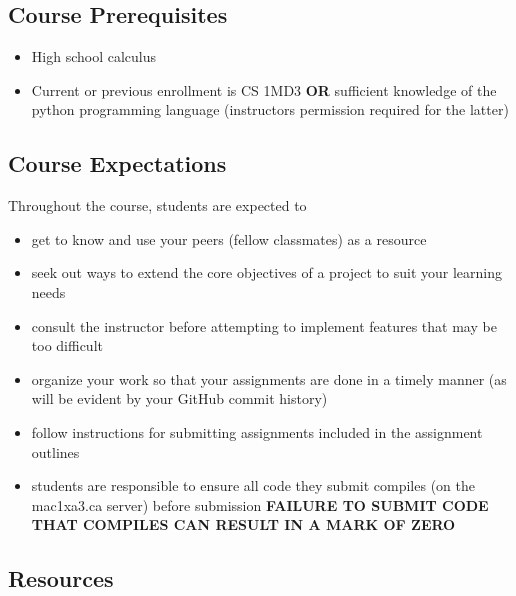 \documentclass{article}
\begin{document}
\subsection{Course Prerequisites}
\label{sec:org0a21196}
\begin{itemize}
\item High school calculus
\item Current or previous enrollment is CS 1MD3 \textbf{OR} sufficient knowledge of the
python programming language (instructors permission required for the latter)
\end{itemize}

\subsection{Course Expectations}
\label{sec:org3a9325b}
Throughout the course, students are expected to
\begin{itemize}
\item get to know and use your peers (fellow classmates) as a resource
\item seek out ways to extend the core objectives of a project to suit your
learning needs
\item consult the instructor before attempting to implement features that may be too difficult
\item organize your work so that your assignments are done in a timely manner (as
will be evident by your GitHub commit history)
\item follow instructions for submitting assignments included in the assignment outlines
\item students are responsible to ensure all code they submit compiles (on the mac1xa3.ca
server) before submission \textbf{FAILURE TO SUBMIT CODE THAT COMPILES CAN RESULT
IN A MARK OF ZERO}
\end{itemize}

\subsection{Resources}
\label{sec:org88dc284}
\end{document}
